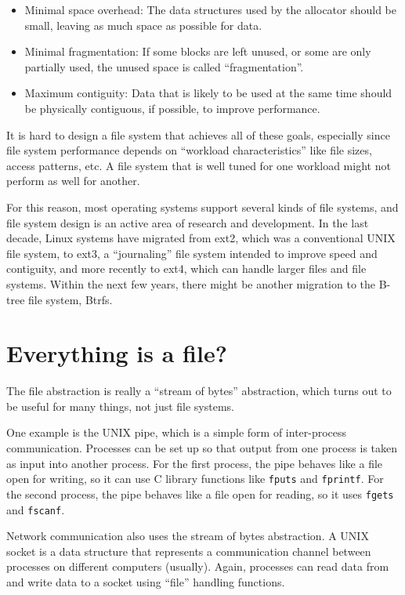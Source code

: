 \documentclass[12pt]{book}
\begin{document}
{\begin{itemize}
\item Minimal space overhead: The data structures used by the allocator
  should be small, leaving as much space as possible for data.

\item Minimal fragmentation: If some blocks are left unused, or some
  are only partially used, the unused space is called
  ``fragmentation''.

\item Maximum contiguity: Data that is likely to be used at the same
  time should be physically contiguous, if possible, to improve
  performance.

\end{itemize}

It is hard to design a file system that achieves all of these
goals, especially since file system performance depends on
``workload characteristics'' like file sizes, access
patterns, etc.  A file system that is well tuned for one workload
might not perform as well for another.

For this reason, most operating systems support several kinds of file
systems, and file system design is an active area of research and
development.  In the last decade, Linux systems have migrated
from ext2, which was a conventional UNIX file system, to ext3,
a ``journaling'' file system intended to improve speed and
contiguity, and more recently to ext4, which can handle larger files
and file systems.  Within the next few years, there might be
another migration to the B-tree file system, Btrfs.


\section{Everything is a file?}

The file abstraction is really a ``stream of bytes'' abstraction,
which turns out to be useful for many things, not just file systems.

One example is the UNIX pipe, which is a simple form of inter-process
communication.  Processes can be set up so that output from one
process is taken as input into another process.  For the first
process, the pipe behaves like a file open for writing, so it
can use C library functions like {\tt fputs} and {\tt fprintf}.
For the second process, the pipe behaves like a file open for
reading, so it uses {\tt fgets} and {\tt fscanf}.

Network communication also uses the stream of bytes abstraction.
A UNIX socket is a data structure that represents a communication
channel between processes on different computers (usually).  Again,
processes can read data from and write data to a socket using
``file'' handling functions.

}
\end{document}
